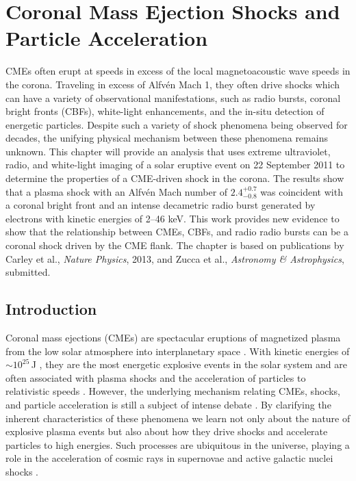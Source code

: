 \vspace{-5mm}
\singlespacing
\chapter{Coronal Mass Ejection Shocks and Particle Acceleration} 
\label{chap:5}
\doublespacing
\vspace{-10mm}
CMEs often erupt at speeds in excess of the local magnetoacoustic wave speeds in the corona. Traveling in excess of Alfv\'{e}n Mach 1, they often drive shocks which can have a variety of observational manifestations, such as radio bursts, coronal bright fronts (CBFs), white-light enhancements, and the in-situ detection of energetic particles. Despite such a variety of shock phenomena being observed for decades, the unifying physical mechanism between these phenomena remains unknown. This chapter will provide an analysis that uses extreme ultraviolet, radio, and white-light imaging of a solar eruptive event on 22 September 2011 to determine the properties of a CME-driven shock in the corona. The results show that a plasma shock with an Alfv\'{e}n Mach number of $2.4^{+0.7}_{-0.8}$ was coincident with a coronal bright front and an intense decametric radio burst generated by electrons with kinetic energies of 2--46 keV. This work provides new evidence to show that the relationship between CMEs, CBFs, and radio radio bursts can be a coronal shock driven by the CME flank. The chapter is based on publications by Carley et al., {\it Nature Physics}, 2013, and Zucca et al., {\it Astronomy \& Astrophysics}, submitted.

\doublespacing
\section{Introduction}\label{sec:1}
Coronal mass ejections (CMEs) are spectacular eruptions of magnetized plasma from the low solar atmosphere into interplanetary space \citep{byrne2010, roussev2012}. With kinetic energies of $\sim$$10^{25}$\,J \citep{vour2010}, they are the most energetic explosive events in the solar system and are often associated with plasma shocks and the acceleration of particles to relativistic speeds \citep{klassen2002, grechnev2011}. However, the underlying mechanism relating CMEs, shocks, and particle acceleration is still a subject of intense debate \citep{vrsnak2008}. By clarifying the inherent characteristics of these phenomena we learn not only about the nature of explosive plasma events but also about how they drive shocks and accelerate particles to high energies. Such processes are ubiquitous in the universe, playing a role in the acceleration of cosmic rays in supernovae and active galactic nuclei shocks \citep{drury2012}.


